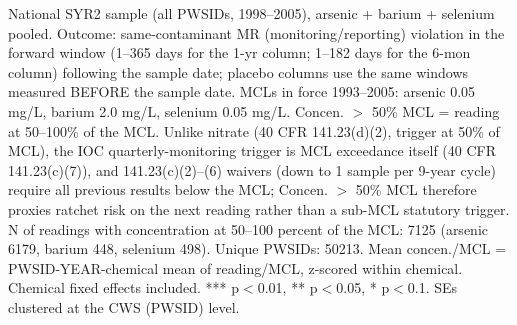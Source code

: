 \begin{table}[htbp]
{\tiny\linespread{1}\selectfont \par \raggedright National SYR2 sample (all PWSIDs, 1998--2005), arsenic + barium + selenium pooled. Outcome: same-contaminant MR (monitoring/reporting) violation in the forward window (1--365 days for the 1-yr column; 1--182 days for the 6-mon column) following the sample date; placebo columns use the same windows measured BEFORE the sample date. MCLs in force 1993--2005: arsenic 0.05 mg/L, barium 2.0 mg/L, selenium 0.05 mg/L. Concen. $>$ 50\% MCL = reading at 50--100\% of the MCL. Unlike nitrate (40 CFR 141.23(d)(2), trigger at 50\% of MCL), the IOC quarterly-monitoring trigger is MCL exceedance itself (40 CFR 141.23(c)(7)), and 141.23(c)(2)--(6) waivers (down to 1 sample per 9-year cycle) require all previous results below the MCL; Concen. $>$ 50\% MCL therefore proxies ratchet risk on the next reading rather than a sub-MCL statutory trigger. N of readings with concentration at 50--100 percent of the MCL: 7125 (arsenic 6179, barium 448, selenium 498). Unique PWSIDs: 50213. Mean concen./MCL = PWSID-YEAR-chemical mean of reading/MCL, z-scored within chemical. Chemical fixed effects included. *** p$<$0.01, ** p$<$0.05, * p$<$0.1. SEs clustered at the CWS (PWSID) level.}
\end{table}
